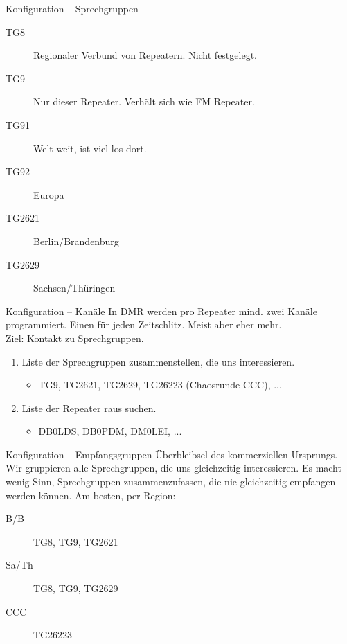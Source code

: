 \documentclass[aspectratio=169]{beamer}
\begin{document}
\begin{frame}{Konfiguration -- Sprechgruppen}
\begin{description}
 \item[TG8] Regionaler Verbund von Repeatern. Nicht festgelegt.
 \item[TG9] Nur dieser Repeater. Verhält sich wie FM Repeater.
 \item[TG91] Welt weit, ist viel los dort.
 \item[TG92] Europa
 \item[TG2621] Berlin/Brandenburg
 \item[TG2629] Sachsen/Thüringen
\end{description}
\end{frame}


\begin{frame}{Konfiguration -- Kanäle}
In DMR werden pro Repeater mind. zwei Kanäle programmiert. Einen für jeden Zeitschlitz. Meist aber eher mehr. \\[0.5cm]

Ziel: Kontakt zu Sprechgruppen. 
\begin{enumerate}
 \item Liste der Sprechgruppen zusammenstellen, die uns interessieren.
 \begin{itemize}
  \item TG9, TG2621, TG2629, TG26223 (Chaosrunde CCC), ...
 \end{itemize}
 \item Liste der Repeater raus suchen.
 \begin{itemize}
  \item DB0LDS, DB0PDM, DM0LEI, ...
 \end{itemize}
\end{enumerate}
\end{frame}

\begin{frame}{Konfiguration -- Empfangsgruppen}
Überbleibsel des kommerziellen Ursprungs. Wir gruppieren alle Sprechgruppen, die uns gleichzeitig interessieren. Es macht wenig Sinn, Sprechgruppen zusammenzufassen, die nie gleichzeitig empfangen werden können. Am besten, per Region:\\[0.5cm]

\begin{description}
 \item[B/B] TG8, TG9, TG2621
 \item[Sa/Th] TG8, TG9, TG2629
 \item[CCC] TG26223
\end{description}
\end{frame}
\end{document}
